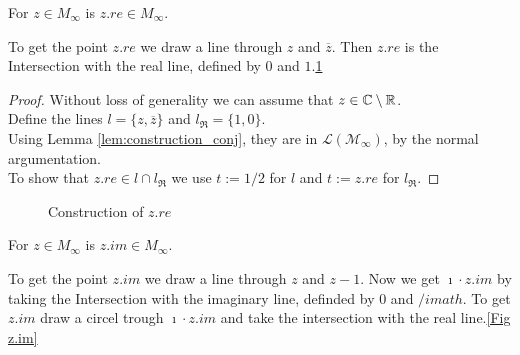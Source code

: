 \begin{lemma}
    \label{lem:construction_real}
    \leanok
    For $z \in M_{\infty}$ is $z.re \in M_{\infty}$.
\end{lemma}
To get the point $z.re$ we draw a line through $z$ and $\overline{z}$. Then $z.re$ is the Intersection with the real line, defined by $0$ and $1$.\ref{Fig z.re}
\begin{proof}
    Without loss of generality we can assume that $z \in \mathbb{C}\setminus\mathbb{R}$.\\
    Define the lines $l = \{z, \overline{z}\}$ and $l_{\Re} = \{1, 0\}$.\\
    Using Lemma \ref{lem:construction_conj}, they are in $\mathcal{L(M_{\infty})}$, by the normal argumentation.\\
    To show that $z.re \in l \cap l_{\Re}$ we use $t:= 1/2$ for $l$ and $t:= z.re$ for $l_{\Re}$.
\end{proof}
\begin{figure}
    \centering
    \caption{Construction of $z.re$}
    \label{Fig z.re}
\end{figure}

\begin{lemma}
    \label{lem:construction_imag}
    \leanok
    For $z \in M_{\infty}$ is $z.im \in M_{\infty}$.
\end{lemma}
To get the point $z.im$ we draw a line through $z$ and $z-1$. Now we get $\imath \cdot z.im$ by taking the Intersection with the imaginary line, definded by $0$ and $/imath$. To get $z.im$ draw a circel trough $\imath \cdot z.im$ and take the intersection with the real line.\ref{Fig z.im}

